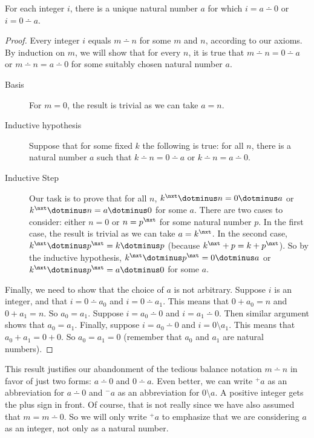 \documentclass[10pt,oneside,tightlist]{memoir}
\begin{document}
\begin{lemma}
  For each integer $i$, there is a unique natural number $a$
  for which $i = a\dotminus 0$ or $i = 0\dotminus a$.
\end{lemma}
\begin{proof}
  Every integer $i$ equals $m\dotminus n$ for some $m$ and $n$, according
  to our axioms.  By induction on $m$, we will show that for every
  $n$, it is true that $m\dotminus n = 0\dotminus a$ or $m\dotminus n
  = a\dotminus 0$ for some suitably chosen natural number $a$.
  \begin{description}
  \item[Basis] For $m=0$, the result is trivial as we can take $a=n$.
  \item[Inductive hypothesis] Suppose that for some fixed $k$ the
    following is true: for all $n$, there is a natural number $a$
    such that $k\dotminus n = 0\dotminus
    a$ or $k\dotminus n = a\dotminus 0$.
  \item[Inductive Step] Our task is to prove that for all $n$, $k^\nxt
    \dotminus n = 0 \dotminus a$ or $k^\nxt \dotminus n = a \dotminus
    0$ for some $a$. There are two cases to consider: either $n = 0$
    or $n = p^\nxt$ for some natural number $p$.  In the first case,
    the result is trivial as we can take $a = k^\nxt$.  In the second
    case, $k^\nxt \dotminus p^\nxt = k\dotminus p$ (because $k^\nxt +
    p = k + p^\nxt$).  So by the inductive hypothesis, 
    $k^\nxt\dotminus p^\nxt = 0\dotminus a$ or $k^\nxt\dotminus p^\nxt =
    a\dotminus 0$ for some $a$.
  \end{description}

  Finally, we need to show that the choice of $a$ is not
  arbitrary. Suppose $i$ is an integer, and that $i = 0\dotminus a_0$
  and $i = 0\dotminus a_1$. This means that $0+a_0 = n$ and $0 + a_1 =
  n$.  So $a_0 = a_1$. Suppose $i =
  a_0 \dotminus 0$ and $i=a_1\dotminus 0$. Then similar argument shows
  that $a_0=a_1$. Finally, suppose $i = a_0\dotminus 0$ and $i =
  0\setminus a_1$.  This means that $a_0 + a_1 = 0 + 0$. So 
  $a_0 = a_1 = 0$ (remember that $a_0$ and $a_1$ are natural numbers).
\end{proof}

This result justifies our abandonment of the tedious balance notation
$m\dotminus n$ in favor of just two forms: $a \dotminus 0$ and $0\dotminus a$.
Even better, we can write ${}^+a$ as an abbreviation for $a\dotminus 0$ and ${}^-a$ as
an abbreviation for $0\setminus a$.
A positive integer gets the plus sign in front. Of course,
that is not really since we have also assumed that $m = m\dotminus 0$. 
So we will only write ${}^+a$ to emphasize that we are considering $a$
as an integer, not only as a natural number.
\end{document}
